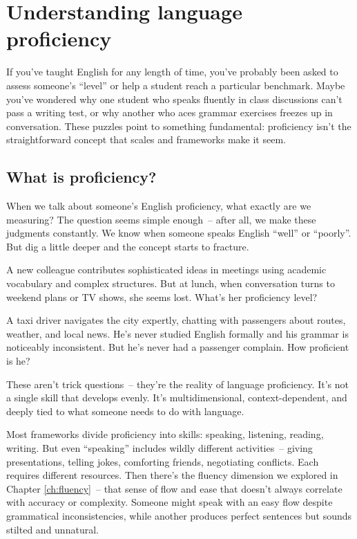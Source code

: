 \appendix \label{ch:appendix}

\chapter{Understanding language proficiency}
\label{ch:proficiency}

If you've taught English for any length of time, you've probably been asked to assess someone's ``level'' or help a student reach a particular benchmark. Maybe you've wondered why one student who speaks fluently in class discussions can't pass a writing test, or why another who aces grammar exercises freezes up in conversation. These puzzles point to something fundamental: proficiency isn't the straightforward concept that scales and frameworks make it seem.

\section{What is proficiency?}

When we talk about someone's English proficiency, what exactly are we measuring? The question seems simple enough~-- after all, we make these judgments constantly. We know when someone speaks English ``well'' or ``poorly''. But dig a little deeper and the concept starts to fracture.

\ea A new colleague contributes sophisticated ideas in meetings using academic vocabulary and complex structures. But at lunch, when conversation turns to weekend plans or TV shows, she seems lost. What's her proficiency level?
\z

\ea A taxi driver navigates the city expertly, chatting with passengers about routes, weather, and local news. He's never studied English formally and his grammar is noticeably inconsistent. But he's never had a passenger complain. How proficient is he?
\z

These aren't trick questions~-- they're the reality of language proficiency. It's not a single skill that develops evenly. It's multidimensional, context-dependent, and deeply tied to what someone needs to do with language.

Most frameworks divide proficiency into skills: speaking, listening, reading, writing. But even ``speaking'' includes wildly different activities~-- giving presentations, telling jokes, comforting friends, negotiating conflicts. Each requires different resources. Then there's the fluency dimension we explored in Chapter \ref{ch:fluency}~-- that sense of flow and ease that doesn't always correlate with accuracy or complexity. Someone might speak with an easy flow despite grammatical inconsistencies, while another produces perfect sentences but sounds stilted and unnatural.

